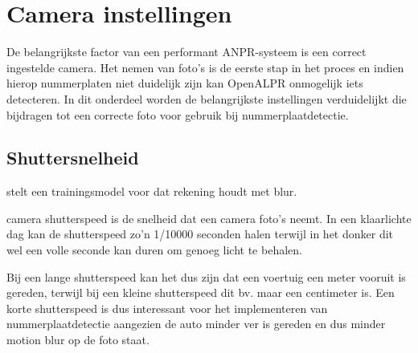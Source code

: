\section{Camera instellingen}
De belangrijkste factor van een performant ANPR-systeem is een correct ingestelde camera. Het nemen van foto's is de eerste stap in het proces en indien hierop nummerplaten niet duidelijk zijn kan OpenALPR onmogelijk iets detecteren. In dit onderdeel worden de belangrijkste instellingen verduidelijkt die bijdragen tot een correcte foto voor gebruik bij nummerplaatdetectie.

\subsection{Shuttersnelheid}
\textcite{guo2017vehicle} stelt een trainingsmodel voor dat rekening houdt met blur.

camera shutterspeed is de snelheid dat een camera foto's neemt. In een klaarlichte dag kan de shutterspeed zo'n 1/10000 seconden halen terwijl in het donker dit wel een volle seconde kan duren om genoeg licht te behalen. \autocite{openalprcameraplacement}

Bij een lange shutterspeed kan het dus zijn dat een voertuig een meter vooruit is gereden, terwijl bij een kleine shutterspeed dit bv. maar een centimeter is. Een korte shutterspeed is dus interessant voor het implementeren van nummerplaatdetectie aangezien de auto minder ver is gereden en dus minder motion blur op de foto staat.

